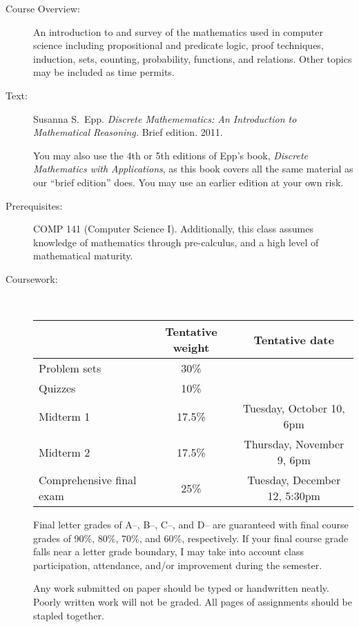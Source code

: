 \documentclass [letterpaper,10pt]{article}
\begin{document}
\begin{description}

\item[Course Overview:] An introduction to and survey of the mathematics used in computer science including propositional and predicate logic, proof techniques, induction, 
sets, counting, probability, functions, and relations. Other topics may be included as time permits.

\item[Text:] Susanna S.~Epp.  \textit{Discrete Mathemematics: An Introduction to 
Mathematical Reasoning.}  Brief edition.  2011.  

You may also use the 4th or 5th editions of Epp's book, \textit{Discrete Mathematics with Applications}, as this book covers all the same material as our ``brief edition'' does.  You may use an earlier
edition at your own risk.

\item[Prerequisites:] COMP 141 (Computer Science I).  Additionally, this class assumes knowledge of 
mathematics through pre-calculus, and a high level of mathematical maturity.

\item[Coursework:] \

\begin{tabular}{lcc} 
& Tentative weight & Tentative date \\ \hline
Problem sets & 30\% & \\
Quizzes & 10\% & \\
Midterm 1 & 17.5\% & Tuesday, October 10, 6pm \\
Midterm 2 & 17.5\% & Thursday, November 9, 6pm \\
Comprehensive final exam & 25\% & Tuesday, December 12, 5:30pm \\
\end{tabular}

Final letter grades of A--, B--, C--, and D-- are guaranteed with final course grades of 90\%, 80\%,
70\%, and 60\%, respectively.
If your final course grade falls near a letter grade boundary,
I may take into account class participation, attendance, and/or improvement during the semester.

Any work submitted on paper should be typed or handwritten neatly. Poorly written work will not be graded. All pages of assignments should be stapled together.


\end{description}
\end{document}
